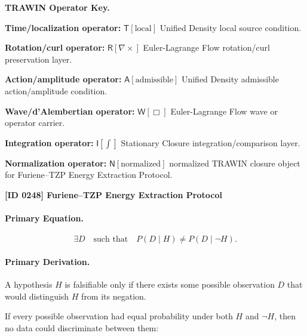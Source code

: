 \par\vspace{0.45\baselineskip}
\noindent\begin{minipage}[t]{\linewidth}
\begingroup
\small
\raggedright
\textbf{TRAWIN Operator Key.}\par
\noindent\textbf{Time/localization operator:} $\mathsf{T}\!\left[\mathrm{local}\right]$ Unified Density local source condition.\par
\noindent\textbf{Rotation/curl operator:} $\mathsf{R}\!\left[\nabla\times\right]$ Euler-Lagrange Flow rotation/curl preservation layer.\par
\noindent\textbf{Action/amplitude operator:} $\mathsf{A}\!\left[\mathrm{admissible}\right]$ Unified Density admissible action/amplitude condition.\par
\noindent\textbf{Wave/d'Alembertian operator:} $\mathsf{W}\!\left[\Box\right]$ Euler-Lagrange Flow wave or operator carrier.\par
\noindent\textbf{Integration operator:} $\mathsf{I}\!\left[\int\right]$ Stationary Closure integration/comparison layer.\par
\noindent\textbf{Normalization operator:} $\mathsf{N}\!\left[\mathrm{normalized}\right]$ normalized TRAWIN closure object for Furiene--TZP Energy Extraction Protocol.\par
\endgroup
\end{minipage}

\clearpage
\noindent\textbf{[ID 0248] Furiene--TZP Energy Extraction Protocol}\par
\vspace{0.35em}
\paragraph{Primary Equation.}
\begin{equation}
\exists D
\quad\text{such that}\quad
P(D\mid H)\neq P(D\mid \neg H).
\end{equation}

\paragraph{Primary Derivation.}
A hypothesis $H$ is falsifiable only if there exists some possible observation $D$ that would distinguish $H$ from its negation.

If every possible observation had equal probability under both $H$ and $\neg H$, then no data could discriminate between them:

